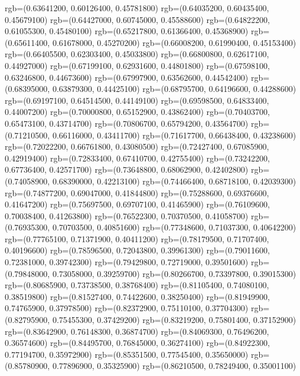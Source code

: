 {{      rgb=(0.63641200, 0.60126400, 0.45781800)
      rgb=(0.64035200, 0.60435400, 0.45679100)
      rgb=(0.64427000, 0.60745000, 0.45588600)
      rgb=(0.64822200, 0.61055300, 0.45480100)
      rgb=(0.65217800, 0.61366400, 0.45368900)
      rgb=(0.65611400, 0.61678000, 0.45270200)
      rgb=(0.66008200, 0.61990400, 0.45153400)
      rgb=(0.66405500, 0.62303400, 0.45033800)
      rgb=(0.66800800, 0.62617100, 0.44927000)
      rgb=(0.67199100, 0.62931600, 0.44801800)
      rgb=(0.67598100, 0.63246800, 0.44673600)
      rgb=(0.67997900, 0.63562600, 0.44542400)
      rgb=(0.68395000, 0.63879300, 0.44425100)
      rgb=(0.68795700, 0.64196600, 0.44288600)
      rgb=(0.69197100, 0.64514500, 0.44149100)
      rgb=(0.69598500, 0.64833400, 0.44007200)
      rgb=(0.70000800, 0.65152900, 0.43862400)
      rgb=(0.70403700, 0.65473100, 0.43714700)
      rgb=(0.70806700, 0.65794200, 0.43564700)
      rgb=(0.71210500, 0.66116000, 0.43411700)
      rgb=(0.71617700, 0.66438400, 0.43238600)
      rgb=(0.72022200, 0.66761800, 0.43080500)
      rgb=(0.72427400, 0.67085900, 0.42919400)
      rgb=(0.72833400, 0.67410700, 0.42755400)
      rgb=(0.73242200, 0.67736400, 0.42571700)
      rgb=(0.73648800, 0.68062900, 0.42402800)
      rgb=(0.74058900, 0.68390000, 0.42213100)
      rgb=(0.74466400, 0.68718100, 0.42039300)
      rgb=(0.74877200, 0.69047000, 0.41844800)
      rgb=(0.75288600, 0.69376600, 0.41647200)
      rgb=(0.75697500, 0.69707100, 0.41465900)
      rgb=(0.76109600, 0.70038400, 0.41263800)
      rgb=(0.76522300, 0.70370500, 0.41058700)
      rgb=(0.76935300, 0.70703500, 0.40851600)
      rgb=(0.77348600, 0.71037300, 0.40642200)
      rgb=(0.77765100, 0.71371900, 0.40411200)
      rgb=(0.78179500, 0.71707400, 0.40196600)
      rgb=(0.78596500, 0.72043800, 0.39961300)
      rgb=(0.79011600, 0.72381000, 0.39742300)
      rgb=(0.79429800, 0.72719000, 0.39501600)
      rgb=(0.79848000, 0.73058000, 0.39259700)
      rgb=(0.80266700, 0.73397800, 0.39015300)
      rgb=(0.80685900, 0.73738500, 0.38768400)
      rgb=(0.81105400, 0.74080100, 0.38519800)
      rgb=(0.81527400, 0.74422600, 0.38250400)
      rgb=(0.81949900, 0.74765900, 0.37978500)
      rgb=(0.82372900, 0.75110100, 0.37704300)
      rgb=(0.82795900, 0.75455300, 0.37429200)
      rgb=(0.83219200, 0.75801400, 0.37152900)
      rgb=(0.83642900, 0.76148300, 0.36874700)
      rgb=(0.84069300, 0.76496200, 0.36574600)
      rgb=(0.84495700, 0.76845000, 0.36274100)
      rgb=(0.84922300, 0.77194700, 0.35972900)
      rgb=(0.85351500, 0.77545400, 0.35650000)
      rgb=(0.85780900, 0.77896900, 0.35325900)
      rgb=(0.86210500, 0.78249400, 0.35001100)
}}
